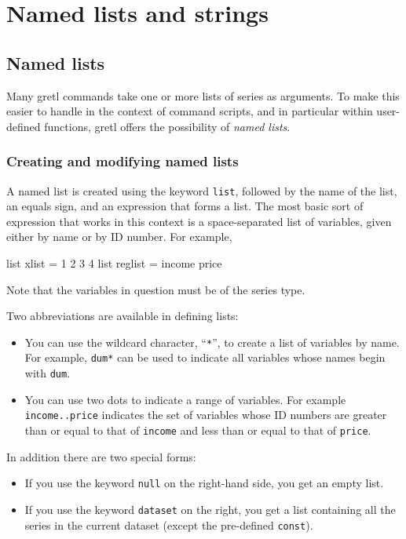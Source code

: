 \chapter{Named lists and strings}
\label{chap:lists-strings}


\section{Named lists}
\label{named-lists}

Many gretl commands take one or more lists of series as
arguments.  To make this easier to handle in the context of command
scripts, and in particular within user-defined functions, gretl
offers the possibility of \textit{named lists}.  

\subsection{Creating and modifying named lists}

A named list is created using the keyword \texttt{list}, followed by
the name of the list, an equals sign, and an expression that forms a
list.  The most basic sort of expression that works in this context
is a space-separated list of variables, given either by name or
by ID number.  For example,
%
\begin{code}
list xlist = 1 2 3 4
list reglist = income price 
\end{code}

Note that the variables in question must be of the series type.

Two abbreviations are available in defining lists:
\begin{itemize}
\item You can use the wildcard character, ``\texttt{*}'', to create a
  list of variables by name. For example, \texttt{dum*} can be used to
  indicate all variables whose names begin with \texttt{dum}.
\item You can use two dots to indicate a range of variables. For
  example \texttt{income..price} indicates the set of variables whose
  ID numbers are greater than or equal to that of \texttt{income}
  and less than or equal to that of \texttt{price}.
\end{itemize}

In addition there are two special forms:
\begin{itemize}
\item If you use the keyword \texttt{null} on the right-hand side,
  you get an empty list.
\item If you use the keyword \texttt{dataset} on the right, you get
  a list containing all the series in the current dataset (except
  the pre-defined \texttt{const}).
\end{itemize}

